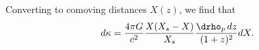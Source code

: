 Converting to comoving distances $X(z)$, we find that
\begin{equation}
\label{eqn:dkappa}
d\kappa = \frac{4 \pi G}{c^2}\frac{X (X_s - X)}{X_s} \frac{\drho_p\,dz}{(1+z)^2} dX.
\end{equation}
  
  